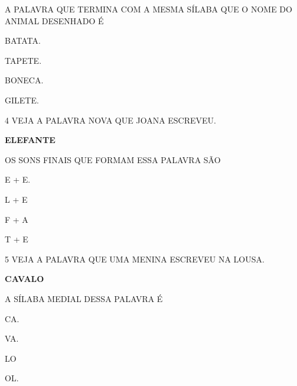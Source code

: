 A PALAVRA QUE TERMINA COM A MESMA SÍLABA QUE O NOME DO ANIMAL DESENHADO É

\begin{multicols}{2}
\begin{escolha}
\item BATATA.

\item TAPETE.

\item BONECA.

\item GILETE.
\end{escolha}
\end{multicols}

\num{4} VEJA A PALAVRA NOVA QUE JOANA ESCREVEU.

\begin{myquote}
\centering\LARGE\textbf{ELEFANTE}
\end{myquote}


OS SONS FINAIS QUE FORMAM ESSA PALAVRA SÃO

\begin{multicols}{2}
\begin{escolha}
\item E + E.

\item L + E

\item F + A

\item T + E
\end{escolha}
\end{multicols}

\pagebreak

\num{5} VEJA A PALAVRA QUE UMA MENINA ESCREVEU NA LOUSA.

\begin{myquote}
\centering\LARGE\textbf{CAVALO}
\end{myquote}

A SÍLABA MEDIAL DESSA PALAVRA É

\begin{escolha}
\item CA.

\item VA.

\item LO

\item OL.
\end{escolha}


